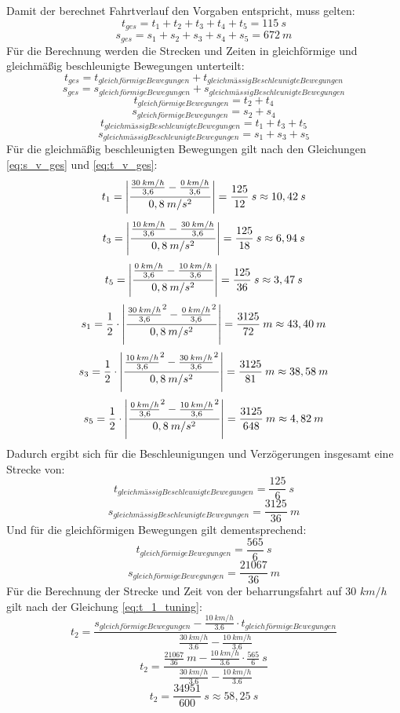 \noindent Damit der berechnet Fahrtverlauf den Vorgaben entspricht, muss gelten:
\[t_{ges} = t_1 + t_2 + t_3 + t_4 + t_5 = 115\:s\]
\[s_{ges} = s_1 + s_2 + s_3 + s_4 + s_5 = 672\:m\]
Für die Berechnung werden die Strecken und Zeiten in gleichförmige und gleichmäßig beschleunigte Bewegungen unterteilt:
\[t_{ges} = t_{gleichförmige Bewegungen} + t_{gleichmässig Beschleunigte Bewegungen}\]
\[s_{ges} = s_{gleichförmige Bewegungen} + s_{gleichmässig Beschleunigte Bewegungen}\]
\[t_{gleichförmige Bewegungen} = t_2 + t_4\]
\[s_{gleichförmige Bewegungen} = s_2 + s_4\]
\[t_{gleichmässig Beschleunigte Bewegungen} = t_1 + t_3 + t_5\]
\[s_{gleichmässig Beschleunigte Bewegungen} = s_1 + s_3 + s_5\]
Für die gleichmäßig beschleunigten Bewegungen gilt nach den Gleichungen \ref{eq:s_v_ges} und \ref{eq:t_v_ges}:
\[t_1 = \left\vert\frac{\frac{30\:km/h}{3,6}-\frac{0\:km/h}{3,6}}{0,8\:m/s^{2}}\right\vert = \frac{125}{12}\:s \approx 10,42\:s\]
\[t_3 = \left\vert\frac{\frac{10\:km/h}{3,6}-\frac{30\:km/h}{3,6}}{0,8\:m/s^{2}}\right\vert = \frac{125}{18}\:s \approx 6,94\:s\]
\[t_5 = \left\vert\frac{\frac{0\:km/h}{3,6}-\frac{10\:km/h}{3,6}}{0,8\:m/s^{2}}\right\vert = \frac{125}{36}\:s \approx 3,47\:s\]
\[s_1 = \frac{1}{2}\cdot\left\vert\frac{{\frac{30\:km/h}{3,6}}^2-{\frac{0\:km/h}{3,6}}^2}{0,8\:m/s^{2}}\right\vert = \frac{3125}{72}\:m \approx 43,40\:m\]
\[s_3 = \frac{1}{2}\cdot\left\vert\frac{{\frac{10\:km/h}{3,6}}^2-{\frac{30\:km/h}{3,6}}^2}{0,8\:m/s^{2}}\right\vert = \frac{3125}{81}\:m \approx 38,58\:m\]
\[s_5 = \frac{1}{2}\cdot\left\vert\frac{{\frac{0\:km/h}{3,6}}^2-{\frac{10\:km/h}{3,6}}^2}{0,8\:m/s^{2}}\right\vert = \frac{3125}{648}\:m \approx 4,82\:m\]
Dadurch ergibt sich für die Beschleunigungen und Verzögerungen insgesamt eine Strecke von:
\[t_{gleichmässig Beschleunigte Bewegungen} = \frac{125}{6}\:s\]
\[s_{gleichmässig Beschleunigte Bewegungen} = \frac{3125}{36}\:m\]
Und für die gleichförmigen Bewegungen gilt dementsprechend:
\[t_{gleichförmige Bewegungen} = \frac{565}{6}\:s\]
\[s_{gleichförmige Bewegungen} = \frac{21067}{36}\:m\]
Für die Berechnung der Strecke und Zeit von der \Gls{beharrungsfahrt} auf 30 $km/h$ gilt nach der Gleichung \ref{eq:t_1_tuning}:
\[t_{2} = \frac{s_{gleichförmige Bewegungen} - \frac{10\:km/h}{3.6} \cdot t_{gleichförmige Bewegungen}}{\frac{30\:km/h}{3.6} - \frac{10\:km/h}{3.6}}\]
\[t_{2} = \frac{\frac{21067}{36}\:m - \frac{10\:km/h}{3.6} \cdot \frac{565}{6}\:s}{\frac{30\:km/h}{3.6} - \frac{10\:km/h}{3.6}}\]
\[t_{2} = \frac{34951}{600}\:s \approx 58,25\:s\]
